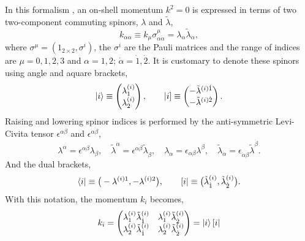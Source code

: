 \documentclass[a4paper,11pt]{article}
\begin{document}
In this formalism \cite{Dixon:1996wi}, an on-shell momentum $k^2=0$ is expressed in terms of two two-component commuting spinors, $\lambda$ and $\tilde{\lambda}$,
\begin{equation}
    k_{\alpha \dot{\alpha}}\equiv k_{\mu}\sigma^{\mu}_{\alpha \dot{\alpha} }=\lambda_\alpha \tilde{\lambda}_{\dot{\alpha}},
\end{equation}
where $\sigma^\mu=(1_{2\times 2},\sigma^i)$, the $\sigma^i$ are the Pauli matrices and the range of indices are $\mu=0,1,2,3$ and $\alpha=1,2;\, \dot\alpha=\dot{1},\dot{2}$. It is customary to denote these spinors using angle and aquare brackets,
\begin{equation}
    \ket{i}\equiv \begin{pmatrix}
        \lambda_1^{(i)}\\
        \lambda_2^{(i)}
    \end{pmatrix},\qquad |i]\equiv \begin{pmatrix}
    -\tilde{\lambda}^{(i){\dot{1}}}\\
    -\tilde{\lambda}^{(i){\dot{2}}}
    \end{pmatrix}.
\end{equation}
Raising and lowering spinor indices is performed by the anti-symmetric Levi-Civita tensor $\epsilon^{\alpha \beta}$ and $\epsilon^{\dot{\alpha}\dot{\beta}}$,
\begin{equation}
    \lambda^\alpha=\epsilon^{\alpha \beta}\lambda_\beta,\quad \tilde{\lambda}^{\dot{\alpha}}=\epsilon^{\dot{\alpha}\dot{\beta}}\tilde{\lambda}_{\dot \beta},
    \quad \lambda_\alpha=\epsilon_{\alpha \beta}\lambda^\beta,\quad \tilde{\lambda}_{\dot{\alpha}}=\epsilon_{\dot{\alpha}\dot{\beta}}\tilde{\lambda}^{\dot \beta}.
\end{equation}
And the dual brackets,
    \begin{equation}
        \bra{i}\equiv \big(-\lambda^{(i)1},-\lambda^{(i)2}\big)
        ,\qquad [i|\equiv 
        \big(\tilde{\lambda}_{\dot{1}}^{(i)},
        \tilde{\lambda}_{\dot{2}}^{(i)}\big).
    \end{equation}
With this notation, the momentum $k_i$ becomes,
\begin{equation}
    k_i=\begin{pmatrix}
        \lambda_1^{(i)}\tilde{\lambda}_{\dot{1}}^{(i)}&\lambda_1^{(i)}\tilde{\lambda}_{\dot{2}}^{(i)}\\
        \lambda_2^{(i)}\tilde{\lambda}_{\dot{1}}^{(i)}&\lambda_2^{(i)}\tilde{\lambda}_{\dot{2}}^{(i)}
    \end{pmatrix}=\ket{i}[i|
\end{equation}
\end{document}
